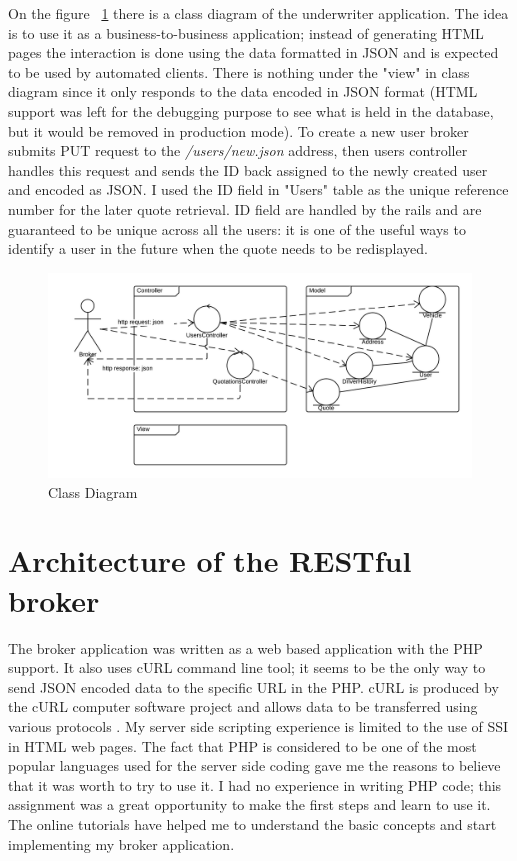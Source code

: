 \documentclass[10pt,a4paper,headinclude=true,twoside]{report}
\begin{document}
On the figure ~\ref{fig:ClassDesign} there is a class diagram of the underwriter application. The idea is to use it as a business-to-business application; instead of generating HTML pages the interaction is done using the data formatted in JSON and is expected to be used by automated clients. There is nothing under the "view" in class diagram since it only responds to the data encoded in JSON format (HTML support was left for the debugging purpose to see what is held in the database, but it would be removed in production mode). To create a new user broker submits PUT request to the \textit{/users/new.json} address, then users controller handles this request and sends the ID back assigned to the newly created user and encoded as JSON. I used the ID field in "Users" table as the unique reference number for the later quote retrieval. ID field are handled by the rails and are guaranteed to be unique across all the users: it is one of the useful ways to identify a user in the future when the quote needs to be redisplayed. 

\begin{figure}[H]
\centering
\centerline{\includegraphics[scale=0.25]{./ClassDesign}}
\caption{Class Diagram}
\label{fig:ClassDesign}
\end{figure}



\section{Architecture of the RESTful broker}
The broker application was written as a web based application with the PHP support. It also uses cURL command line tool; it seems to be the only way to send JSON encoded data to the specific URL in the PHP. cURL is produced by the cURL computer software project and allows data to be transferred using various protocols \cite{cURL}. My server side scripting experience is limited to the use of SSI in HTML web pages. The fact that PHP is considered to be one of the most popular languages used for the server side coding \cite{PHP} gave me the reasons to believe that it was worth to try to use it. I had no experience in writing PHP code; this assignment was a great opportunity to make the first steps and learn to use it. The online tutorials have helped me to understand the basic concepts and start implementing my broker application.
\end{document}
